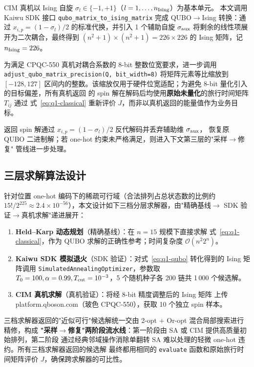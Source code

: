\documentclass[UTF8,12pt,a4paper]{ctexart}
\begin{document}
CIM 真机以 Ising 自旋 $\sigma_{l}\in\{-1,+1\}$（$l=1,\dots,n_{\rm Ising}$）为基本单元。
本文调用 Kaiwu SDK 接口 \texttt{qubo\_matrix\_to\_ising\_matrix} 完成 QUBO$\to$Ising
转换：通过 $x_{i,p}=(1-\sigma_{l})/2$ 的标准代换，并引入 1 个辅助自旋 $\sigma_{\rm aux}$
将剩余的线性项展开为二次耦合，最终得到 $(n^{2}+1)\times(n^{2}+1)=226\times 226$ 的 Ising
矩阵，记 $n_{\rm Ising}=226$。

为满足 CPQC-550 真机对耦合系数的 8-bit 整数位宽要求，进一步调用
\texttt{adjust\_qubo\_matrix\_precision(Q, bit\_width=8)} 将矩阵元素等比缩放到 $[-128,127]$
区间内的整数。该缩放仅用于硬件位宽适配；为避免 8-bit 量化引入的目标偏差，所有真机返回
的 spin 解在解码后均使用\textbf{原始未量化}的旅行时间矩阵 $T_{ij}$ 通过
式~\eqref{eq:q1-classical} 重新评价 $J$，而非以真机返回的能量值作为业务目标。

返回 spin 解通过 $x_{i,p}=(1-\sigma_{l})/2$ 反代解码并丢弃辅助维 $\sigma_{\rm aux}$，
恢复原 QUBO 二进制解；若 one-hot 约束未严格满足，则进入下文第三层的"采样$\to$修复"
管线进一步处理。

\subsection{三层求解算法设计}
\label{subsec:q1-algo}

针对位置 one-hot 编码下的稀疏可行域（合法排列占总状态数的比例约
$15!/2^{225}\!\approx\!2.4\times 10^{-56}$），本文设计如下三档分层求解器，由"精确基线$\to$
SDK 验证$\to$真机求解"递进展开：
\begin{enumerate}
  \item[(i)] \textbf{Held--Karp 动态规划}（精确基线）：在 $n=15$ 规模下直接求解
    式~\eqref{eq:q1-classical}，作为 QUBO 求解的正确性参考；时间复杂度 $\mathcal{O}(n^{2}2^{n})$。
  \item[(ii)] \textbf{Kaiwu SDK 模拟退火}（SDK 验证）：对式~\eqref{eq:q1-qubo} 转化得到的
    Ising 矩阵调用 \texttt{SimulatedAnnealingOptimizer}，参数取 $T_{0}=100,\alpha=0.99,
    T_{\rm cut}=10^{-3}$，5 个随机种子各 200 链共 1\,000 个候选解。
  \item[(iii)] \textbf{CIM 真机求解}（真机验证）：将经 8-bit 精度调整后的 Ising 矩阵
    上传 platform.qboson.com（玻色 CPQC-550），获取 10 个独立 spin 样本。
\end{enumerate}
三档求解器返回的"近似可行"候选解统一交由 2-opt $+$ Or-opt 混合局部搜索进行精修，构成
\textbf{"采样$\to$修复"两阶段流水线}：第一阶段由 SA 或 CIM 提供高质量初始排列，第二阶段
通过经典邻域操作消除单翻转 SA 难以处理的轻微 one-hot 违约。所有三档求解器返回的候选解
最终都用相同的 \texttt{evaluate} 函数和原始旅行时间矩阵评价 $J$，确保跨求解器的可比性。
\end{document}
